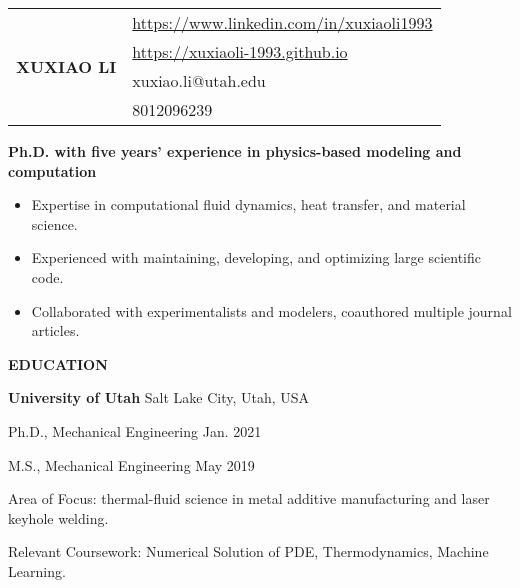 \documentclass[11pt, letterpaper]{article}
\begin{document}
\begin{tabular}{@{} p{} p{} @{}}
   \multirow{4}{*}{{\textbf{\huge XUXIAO LI}}} & 
    \href{https://www.linkedin.com/in/xuxiaoli1993}{https://www.linkedin.com/in/xuxiaoli1993} \\
     & \href{https://xuxiaoli-1993.github.io}{https://xuxiaoli-1993.github.io} \\
     & xuxiao.li@utah.edu \\
     & 8012096239
\end{tabular}

% 
% 
% 

\vspace{24pt}

\textbf{Ph.D. with five years' experience in physics-based modeling and computation}
\begin{itemize}[leftmargin=*, labelsep=5mm]
   \item Expertise in computational fluid dynamics, heat transfer, and material science.
   \item Experienced with maintaining, developing, and optimizing large scientific code.
   \item Collaborated with experimentalists and modelers, coauthored multiple journal articles.
\end{itemize}

\vspace{12pt}

\textbf{EDUCATION}

\fullrule

\textbf{University of Utah} \hfill Salt Lake City, Utah, USA

Ph.D., Mechanical Engineering  \hfill Jan. 2021

M.S., Mechanical Engineering  \hfill May 2019

Area of Focus: thermal-fluid science in metal additive manufacturing and laser keyhole welding.

Relevant Coursework: Numerical Solution of PDE, Thermodynamics, Machine Learning.

\vskip 6pt
\end{document}
